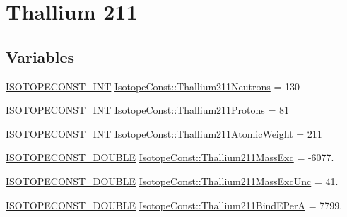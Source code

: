 \hypertarget{group___isotope_const-_thallium-_tl211}{}\section{Thallium 211}
\label{group___isotope_const-_thallium-_tl211}
\subsection*{Variables}
\begin{DoxyCompactItemize}
\item 
\mbox{\hyperlink{group___isotope_const-_macros_ga5f18360b3e99483a35c32d789e62621c}{I\+S\+O\+T\+O\+P\+E\+C\+O\+N\+S\+T\+\_\+\+I\+NT}} \mbox{\hyperlink{group___isotope_const-_thallium-_tl211_ga4eee849355ad753fe20bf2c085fe77a4}{Isotope\+Const\+::\+Thallium211\+Neutrons}} = 130
\item 
\mbox{\hyperlink{group___isotope_const-_macros_ga5f18360b3e99483a35c32d789e62621c}{I\+S\+O\+T\+O\+P\+E\+C\+O\+N\+S\+T\+\_\+\+I\+NT}} \mbox{\hyperlink{group___isotope_const-_thallium-_tl211_gaf2d9c79c88e67434c6981fc96a1e0e2f}{Isotope\+Const\+::\+Thallium211\+Protons}} = 81
\item 
\mbox{\hyperlink{group___isotope_const-_macros_ga5f18360b3e99483a35c32d789e62621c}{I\+S\+O\+T\+O\+P\+E\+C\+O\+N\+S\+T\+\_\+\+I\+NT}} \mbox{\hyperlink{group___isotope_const-_thallium-_tl211_ga69ea896b15e242f8d34d74ca4f42c28e}{Isotope\+Const\+::\+Thallium211\+Atomic\+Weight}} = 211
\item 
\mbox{\hyperlink{group___isotope_const-_macros_ga8f45a7272ce02c0b4c65c44636ed719a}{I\+S\+O\+T\+O\+P\+E\+C\+O\+N\+S\+T\+\_\+\+D\+O\+U\+B\+LE}} \mbox{\hyperlink{group___isotope_const-_thallium-_tl211_ga90d46d9542a5bafa2eaf40fc0520e133}{Isotope\+Const\+::\+Thallium211\+Mass\+Exc}} = -\/6077.
\item 
\mbox{\hyperlink{group___isotope_const-_macros_ga8f45a7272ce02c0b4c65c44636ed719a}{I\+S\+O\+T\+O\+P\+E\+C\+O\+N\+S\+T\+\_\+\+D\+O\+U\+B\+LE}} \mbox{\hyperlink{group___isotope_const-_thallium-_tl211_ga7c68da85676035ab3d38825f905bd84c}{Isotope\+Const\+::\+Thallium211\+Mass\+Exc\+Unc}} = 41.
\item 
\mbox{\hyperlink{group___isotope_const-_macros_ga8f45a7272ce02c0b4c65c44636ed719a}{I\+S\+O\+T\+O\+P\+E\+C\+O\+N\+S\+T\+\_\+\+D\+O\+U\+B\+LE}} \mbox{\hyperlink{group___isotope_const-_thallium-_tl211_ga945e7cb0699e06636f20eed5c654e740}{Isotope\+Const\+::\+Thallium211\+Bind\+E\+PerA}} = 7799.
\item 

\end{DoxyCompactItemize}
